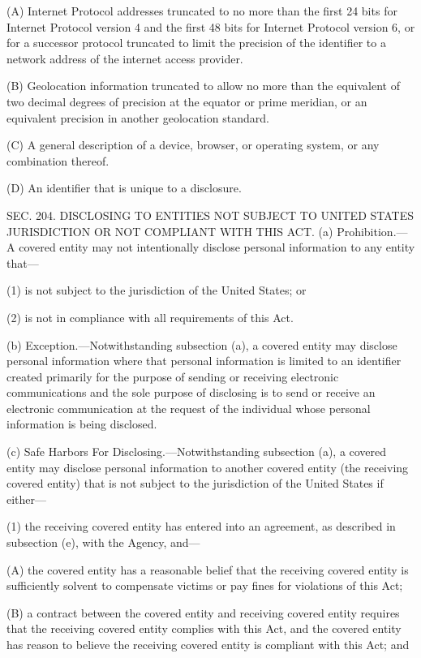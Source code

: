 (A) Internet Protocol addresses truncated to no more than the first 24 bits for Internet Protocol version 4 and the first 48 bits for Internet Protocol version 6, or for a successor protocol truncated to limit the precision of the identifier to a network address of the internet access provider.

(B) Geolocation information truncated to allow no more than the equivalent of two decimal degrees of precision at the equator or prime meridian, or an equivalent precision in another geolocation standard.

(C) A general description of a device, browser, or operating system, or any combination thereof.

(D) An identifier that is unique to a disclosure.


SEC. 204. DISCLOSING TO ENTITIES NOT SUBJECT TO UNITED STATES JURISDICTION OR NOT COMPLIANT WITH THIS ACT.
(a) Prohibition.—A covered entity may not intentionally disclose personal information to any entity that—

(1) is not subject to the jurisdiction of the United States; or

(2) is not in compliance with all requirements of this Act.

(b) Exception.—Notwithstanding subsection (a), a covered entity may disclose personal information where that personal information is limited to an identifier created primarily for the purpose of sending or receiving electronic communications and the sole purpose of disclosing is to send or receive an electronic communication at the request of the individual whose personal information is being disclosed.

(c) Safe Harbors For Disclosing.—Notwithstanding subsection (a), a covered entity may disclose personal information to another covered entity (the receiving covered entity) that is not subject to the jurisdiction of the United States if either—

(1) the receiving covered entity has entered into an agreement, as described in subsection (e), with the Agency, and—

(A) the covered entity has a reasonable belief that the receiving covered entity is sufficiently solvent to compensate victims or pay fines for violations of this Act;

(B) a contract between the covered entity and receiving covered entity requires that the receiving covered entity complies with this Act, and the covered entity has reason to believe the receiving covered entity is compliant with this Act; and

